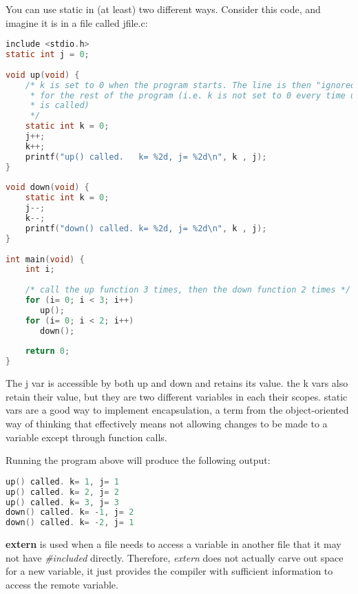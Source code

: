You can use static in (at least) two different ways. Consider this code, and
imagine it is in a file called jfile.c:


\lstset{basicstyle=\scriptsize, numbers=left, captionpos=b, tabsize=4}
\begin{lstlisting}[caption=Section \thesection listing \arabic{varcnt},language={C},
breaklines=true,xleftmargin=15pt,label=lst:section\thesection listing\arabic{varcnt}]
include <stdio.h>
static int j = 0;
	
void up(void) {
	/* k is set to 0 when the program starts. The line is then "ignored"
	 * for the rest of the program (i.e. k is not set to 0 every time up()
	 * is called)
	 */
	static int k = 0;
	j++;
	k++;
	printf("up() called.   k= %2d, j= %2d\n", k , j);
}
	
void down(void) {
	static int k = 0;
	j--;
	k--;
	printf("down() called. k= %2d, j= %2d\n", k , j);
}
	
int main(void) {
	int i;
	  
	/* call the up function 3 times, then the down function 2 times */
	for (i= 0; i < 3; i++)
	   up();
	for (i= 0; i < 2; i++)
	   down();
	 
	return 0;
}
\end{lstlisting}

The j var is accessible by both up and down and retains its value. the k vars
also retain their value, but they are two different variables in each their
scopes. static vars are a good way to implement encapsulation, a term from the
object-oriented way of thinking that effectively means not allowing changes to
be made to a variable except through function calls.

Running the program above will produce the following output:
\lstset{basicstyle=\scriptsize, numbers=left, captionpos=b, tabsize=4}
\begin{lstlisting}[caption=Section \thesection listing \arabic{varcnt},language={C},
breaklines=true,xleftmargin=15pt,label=lst:section\thesection listing\arabic{varcnt}]
up() called. k= 1, j= 1
up() called. k= 2, j= 2
up() called. k= 3, j= 3
down() called. k= -1, j= 2
down() called. k= -2, j= 1
\end{lstlisting}

\textbf{extern} is used when a file needs to access a variable in another file
that it may not have \textit{\#included} directly.  Therefore, \emph{extern}
does not actually carve out space for a new variable, it just provides the
compiler with sufficient information to access the remote variable.

